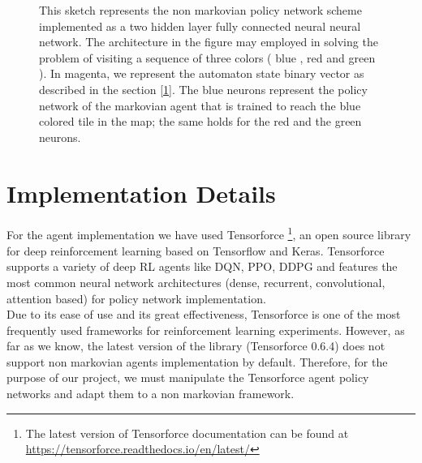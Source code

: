 \documentclass{article}
\begin{document}
\begin{figure}
\caption{This sketch represents the non markovian policy network scheme implemented as a two hidden layer fully connected neural neural network. The architecture in the figure may employed in solving the problem of visiting a sequence of three colors  (\color{blue} blue \color{black}, \color{red} red \color{black} and \color{green} green \color{black}). In \color{magenta} magenta\color{black}, we represent the automaton state binary vector as described in the section [\ref{sec:ImplementationDetails}]. The \color{blue} blue \color{black} neurons represent the policy network of the markovian agent that is trained to reach the \color{blue} blue \color{black} colored tile in the map; the same holds for the \color{red} red \color{black} and the \color{green} green \color{black} neurons.}
\label{fig:nonMarkovianNetwork}
\end{figure}


\section{Implementation Details}\label{sec:ImplementationDetails}

For the agent implementation we have used Tensorforce \footnote{ The latest version of Tensorforce documentation can be found at \url{https://tensorforce.readthedocs.io/en/latest/}}, an open source library for deep reinforcement learning based on Tensorflow and Keras. Tensorforce supports a variety of deep RL agents like DQN, PPO, DDPG and features the most common neural network architectures (dense, recurrent, convolutional, attention based) for policy network implementation.\\
Due to its ease of use and its great effectiveness, Tensorforce is one of the most frequently used frameworks for reinforcement learning experiments. However, as far as we know, the latest version of the library (Tensorforce 0.6.4) does not support non markovian agents implementation by default. Therefore, for the purpose of our project, we must manipulate the Tensorforce agent policy networks and adapt them to a non markovian framework.\\
\end{document}
